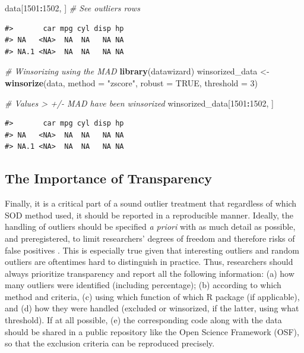\documentclass[sn-basic, lineno,pdflatex]{sn-jnl}
\newenvironment{Shaded}{\begin{snugshade}}{\end{snugshade}}
\newcommand{\AttributeTok}[1]{\textcolor[rgb]{0.13,0.29,0.53}{#1}}
\newcommand{\CommentTok}[1]{\textcolor[rgb]{0.56,0.35,0.01}{\textit{#1}}}
\newcommand{\ConstantTok}[1]{\textcolor[rgb]{0.56,0.35,0.01}{#1}}
\newcommand{\DecValTok}[1]{\textcolor[rgb]{0.00,0.00,0.81}{#1}}
\newcommand{\FunctionTok}[1]{\textcolor[rgb]{0.13,0.29,0.53}{\textbf{#1}}}
\newcommand{\NormalTok}[1]{#1}
\newcommand{\OtherTok}[1]{\textcolor[rgb]{0.56,0.35,0.01}{#1}}
\newcommand{\SpecialCharTok}[1]{\textcolor[rgb]{0.81,0.36,0.00}{\textbf{#1}}}
\newcommand{\StringTok}[1]{\textcolor[rgb]{0.31,0.60,0.02}{#1}}
\begin{document}
\begin{Shaded}
\begin{Highlighting}[]
\NormalTok{data[}\DecValTok{1501}\SpecialCharTok{:}\DecValTok{1502}\NormalTok{, ]  }\CommentTok{\# See outliers rows}
\end{Highlighting}
\end{Shaded}

\begin{verbatim}
#>       car mpg cyl disp hp
#> NA   <NA>  NA  NA   NA NA
#> NA.1 <NA>  NA  NA   NA NA
\end{verbatim}

\begin{Shaded}
\begin{Highlighting}[]
\CommentTok{\# Winsorizing using the MAD}
\FunctionTok{library}\NormalTok{(datawizard)}
\NormalTok{winsorized\_data }\OtherTok{\textless{}{-}} \FunctionTok{winsorize}\NormalTok{(data, }\AttributeTok{method =} \StringTok{"zscore"}\NormalTok{, }\AttributeTok{robust =} \ConstantTok{TRUE}\NormalTok{, }\AttributeTok{threshold =} \DecValTok{3}\NormalTok{)}

\CommentTok{\# Values \textgreater{} +/{-} MAD have been winsorized}
\NormalTok{winsorized\_data[}\DecValTok{1501}\SpecialCharTok{:}\DecValTok{1502}\NormalTok{, ]}
\end{Highlighting}
\end{Shaded}

\begin{verbatim}
#>       car mpg cyl disp hp
#> NA   <NA>  NA  NA   NA NA
#> NA.1 <NA>  NA  NA   NA NA
\end{verbatim}

\subsection{The Importance of
Transparency}\label{the-importance-of-transparency}

Finally, it is a critical part of a sound outlier treatment that
regardless of which SOD method used, it should be reported in a
reproducible manner. Ideally, the handling of outliers should be
specified \emph{a priori} with as much detail as possible, and
preregistered, to limit researchers' degrees of freedom and therefore
risks of false positives \citep{leys2019outliers}. This is especially
true given that interesting outliers and random outliers are oftentimes
hard to distinguish in practice. Thus, researchers should always
prioritize transparency and report all the following information: (a)
how many outliers were identified (including percentage); (b) according
to which method and criteria, (c) using which function of which R
package (if applicable), and (d) how they were handled (excluded or
winsorized, if the latter, using what threshold). If at all possible,
(e) the corresponding code along with the data should be shared in a
public repository like the Open Science Framework (OSF), so that the
exclusion criteria can be reproduced precisely.
\end{document}
